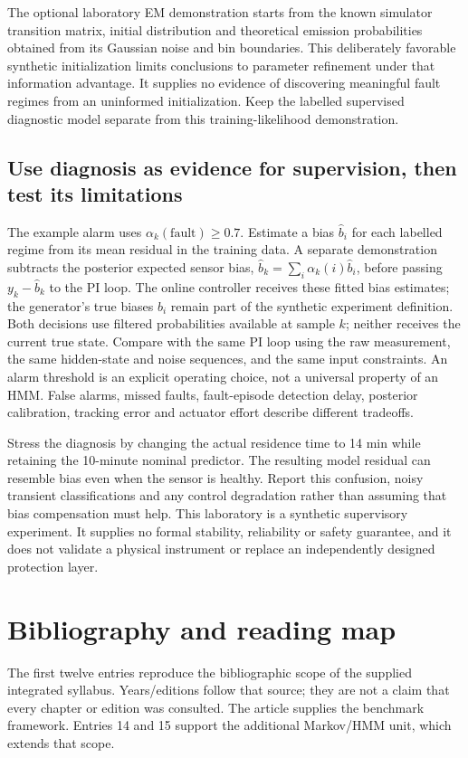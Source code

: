 \documentclass[11pt,a4paper]{article}
\begin{document}
The optional laboratory EM demonstration starts from the known simulator transition matrix, initial distribution and theoretical emission probabilities obtained from its Gaussian noise and bin boundaries. This deliberately favorable synthetic initialization limits conclusions to parameter refinement under that information advantage. It supplies no evidence of discovering meaningful fault regimes from an uninformed initialization. Keep the labelled supervised diagnostic model separate from this training-likelihood demonstration.


\subsection{Use diagnosis as evidence for supervision, then test its limitations}

The example alarm uses $\alpha_k(\mathrm{fault})\geq0.7$. Estimate a bias $\hat b_i$ for each labelled regime from its mean residual in the training data. A separate demonstration subtracts the posterior expected sensor bias, $\hat b_k=\sum_i\alpha_k(i)\hat b_i$, before passing $y_k-\hat b_k$ to the PI loop. The online controller receives these fitted bias estimates; the generator's true biases $b_i$ remain part of the synthetic experiment definition. Both decisions use filtered probabilities available at sample $k$; neither receives the current true state. Compare with the same PI loop using the raw measurement, the same hidden-state and noise sequences, and the same input constraints. An alarm threshold is an explicit operating choice, not a universal property of an HMM. False alarms, missed faults, fault-episode detection delay, posterior calibration, tracking error and actuator effort describe different tradeoffs.


Stress the diagnosis by changing the actual residence time to 14 min while retaining the 10-minute nominal predictor. The resulting model residual can resemble bias even when the sensor is healthy. Report this confusion, noisy transient classifications and any control degradation rather than assuming that bias compensation must help. This laboratory is a synthetic supervisory experiment. It supplies no formal stability, reliability or safety guarantee, and it does not validate a physical instrument or replace an independently designed protection layer.
\clearpage\section{Bibliography and reading map}
The first twelve entries reproduce the bibliographic scope of the supplied integrated syllabus. Years/editions follow that source; they are not a claim that every chapter or edition was consulted. The article supplies the benchmark framework. Entries 14 and 15 support the additional Markov/HMM unit, which extends that scope.
\end{document}
